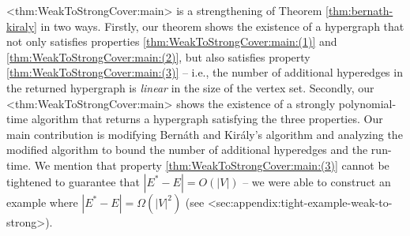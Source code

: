 \documentclass{article}
\def\Cref#1{<#1>}%
\newcommand{\functionMaximizationOracleStrongCover}[1]{\ensuremath{{#1}\text{-}\mathtt{max}\text{-}\mathtt{sc}\text{-}\mathtt{Oracle}}\xspace}
\providecommand{\Z}{\mathbb{Z}}
\begin{document}
\Cref{thm:WeakToStrongCover:main} is a strengthening of Theorem \ref{thm:bernath-kiraly} in two ways. Firstly, our theorem shows the existence of a hypergraph that not only satisfies properties \ref{thm:WeakToStrongCover:main:(1)} and \ref{thm:WeakToStrongCover:main:(2)}, but also satisfies property \ref{thm:WeakToStrongCover:main:(3)} -- i.e., the number of additional hyperedges in the returned hypergraph is \emph{linear} in the size of the vertex set. Secondly, our \Cref{thm:WeakToStrongCover:main} shows the existence of a strongly polynomial-time algorithm that returns a hypergraph satisfying the three properties. 
Our main contribution is modifying Bern\'{a}th and Kir\'{a}ly's algorithm and analyzing the modified algorithm to bound the number of additional hyperedges and the run-time. 
We mention that property \ref{thm:WeakToStrongCover:main:(3)} cannot be tightened to guarantee that $|E^*-E|=O(|V|)$ -- we were able to construct an example where 
$|E^*-E|=\Omega(|V|^2)$ (see \Cref{sec:appendix:tight-example-weak-to-strong}). 

\end{document}
